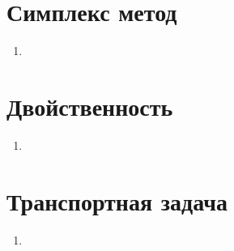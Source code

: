 \documentclass[12pt]{article}
\begin{document}
\section*{Симплекс метод}

\begin{enumerate}
  \item 
\end{enumerate}

\section*{Двойственность}

\begin{enumerate}
  \item 
\end{enumerate}

\section*{Транспортная задача}

\begin{enumerate}
  \item 
\end{enumerate}
\end{document}
